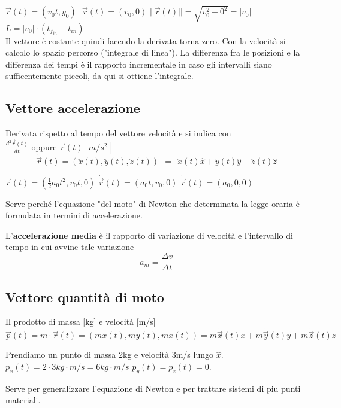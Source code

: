 \begin{example}
    $\vec{r}(t) = (v_0t, y_0)\:\:\: \dot{\vec{r}}(t) = (v_0, 0)$\hspace{15pt}
    $||\dot{\vec{r}}(t)|| = \sqrt{v_0^2 + 0^2} = |v_0|$ \:\:\: $L = |v_0| \cdot (t_{f_{in}} - t_{in})$\\
    Il vettore è costante quindi facendo la derivata torna zero. Con la velocità si calcolo lo spazio percorso ("integrale di linea").
    La differenza fra le posizioni e la differenza dei tempi è il rapporto incrementale in caso gli intervalli siano sufficentemente
    piccoli, da qui si ottiene l'integrale.
\end{example}

\subsection{Vettore accelerazione}
Derivata rispetto al tempo del vettore velocità e si indica con $\frac{d^2\vec{r}(t)}{dt} \text{ oppure } \ddot{\vec{r}}(t) [m/s^2]$
\begin{equation}
    \ddot{\vec{r}}(t) = (\ddot{x}(t), \ddot{y}(t), \ddot{z}(t))\:\: = \:\: \ddot{x}(t)\hat{x} + \ddot{y}(t)\hat{y} + \ddot{z}(t)\hat{z}
\end{equation}
\begin{example}
    $\vec{r}(t)= (\frac{1}{2}a_0t^2, v_0t, 0)$ \hspace{10pt} $\dot{\vec{r}}(t) = (a_0t, v_0, 0)$ \hspace{10pt} $\dot{\vec{r}}(t) = (a_0, 0, 0)$
\end{example}
\hspace{-15pt}Serve perché l'equazione "del moto" di Newton che determinata la legge oraria è formulata in termini di accelerazione.
\begin{definition}
    L'\textbf{accelerazione media} è il rapporto di variazione di velocità e l'intervallo di tempo in cui avvine tale variazione
    $$a_m = \frac{\Delta v}{\Delta t}$$
\end{definition}

\subsection{Vettore quantità di moto}
Il prodotto di massa [kg] e velocità [m/s]
$$\vec{p}(t) = m \cdot \dot{\vec{r}}(t) = (m\dot{x}(t), m\dot{y}(t), m\dot{x}(t)) = m\dot{\vec{x}}(t)x + m\dot{\vec{y}}(t)y + m \dot{\vec{z}}(t)z$$
\begin{example}
    Prendiamo un punto di massa 2kg e velocità 3m/s lungo $\hat{x}$.\\
    $p_x(t) = 2 \cdot 3 kg\cdot m/s = 6 kg \cdot m/s$ \hspace{15pt} $p_y(t) = p_z(t) = 0$.
\end{example}
\hspace{-15pt}Serve per generalizzare l'equazione di Newton e per trattare sistemi di piu punti materiali.

